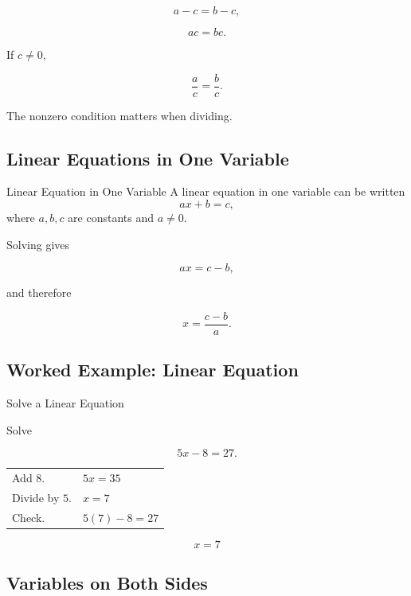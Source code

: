 \[ a-c=b-c, \]

\[ ac=bc. \]

If \(c\neq0\),

\[ \frac ac=\frac bc. \]

The nonzero condition matters when dividing.

\subsection{Linear Equations in One Variable}
\label{subsec:linear-equations-one-variable}

\begin{definitionbox}{Linear Equation in One Variable}
A linear equation in one variable can be written
\[ ax+b=c, \]
where \(a,b,c\) are constants and \(a\neq0\).
\end{definitionbox}

Solving gives

\[ ax=c-b, \]

and therefore

\[ x=\frac{c-b}{a}. \]

\subsection{Worked Example: Linear Equation}
\label{subsec:worked-linear-equation}

\begin{workedexamplebox}{Solve a Linear Equation}

Solve

\[ 5x-8=27. \]

\begin{tabularx}{\textwidth}{@{}>{\raggedright\arraybackslash}p{}X@{}}
Add \(8\). & \(5x=35\)\\
Divide by \(5\). & \(x=7\)\\
Check. & \(5(7)-8=27\)
\end{tabularx}

\begin{answerbox}
\[ x=7 \]
\end{answerbox}
\end{workedexamplebox}

\subsection{Variables on Both Sides}
\label{subsec:variables-both-sides}


